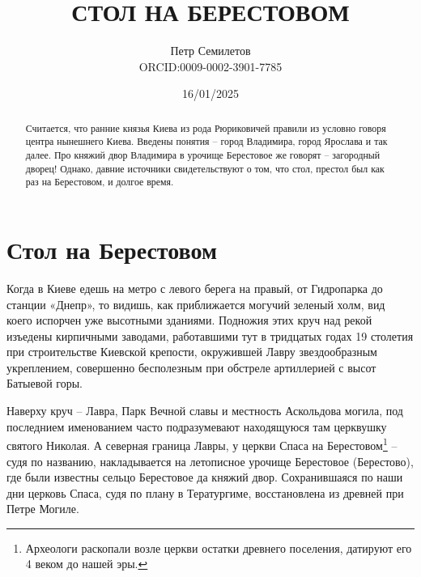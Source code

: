 \documentclass[a5paper,11pt,openany]{article}
\title{СТОЛ НА БЕРЕСТОВОМ\\
\textsmaller[2]{редакция 1.0}}
\author{Петр Семилетов\\ORCID:0009-0002-3901-7785 \orcidlink{0009-0002-3901-7785}}
\date{16/01/2025}
\begin{document}
\maketitle

\pagestyle{empty}


\newpage

\pagestyle{plain}



%
%
%

\begin{abstract}
Считается, что ранние князья Киева из рода Рюриковичей правили из условно говоря центра нынешнего Киева. Введены понятия – город Владимира, город Ярослава и так далее. Про княжий двор Владимира в урочище Берестовое же говорят – загородный дворец! Однако, давние источники свидетельствуют о том, что стол, престол был как раз на Берестовом, и долгое время.
\end{abstract}

\section{Стол на Берестовом}

Когда в Киеве едешь на метро с левого берега на правый, от Гидропарка до станции «Днепр», то видишь, как приближается могучий зеленый холм, вид коего испорчен уже высотными зданиями. Подножия этих круч над рекой изъедены кирпичными заводами, работавшими тут в тридцатых годах 19 столетия при строительстве Киевской крепости, окружившей Лавру звездообразным укреплением, совершенно бесполезным при обстреле артиллерией с высот Батыевой горы.

Наверху круч – Лавра, Парк Вечной славы и местность Аскольдова могила, под последнием именованием часто подразумевают находящуюся там церквушку святого Николая. А северная граница Лавры, у церкви Спаса на Берестовом\footnote{Археологи раскопали возле церкви остатки древнего поселения, датируют его 4 веком до нашей эры.} – судя по названию, накладывается на летописное урочище Берестовое (Берестово), где были известны сельцо Берестовое да княжий двор. Сохранившаяся по наши дни церковь Спаса, судя по плану в Тератургиме, восстановлена из древней при Петре Могиле.

\end{document}
